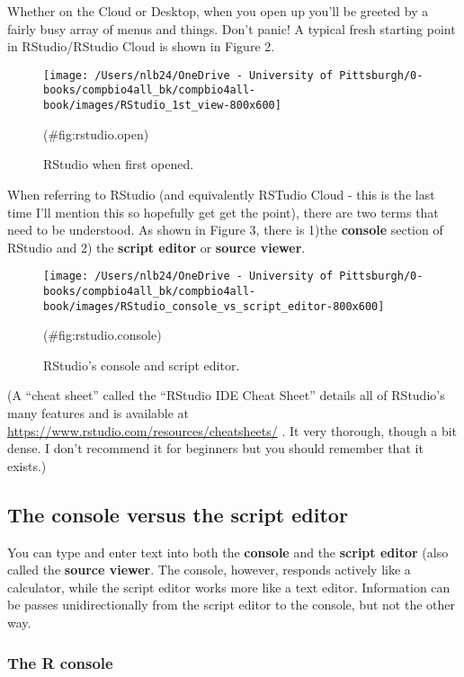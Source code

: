 \documentclass[
]{book}
\begin{document}
Whether on the Cloud or Desktop, when you open up you'll be greeted by a fairly busy array of menus and things. Don't panic! A typical fresh starting point in RStudio/RStudio Cloud is shown in Figure 2.

\begin{figure}
\texttt{[image: /Users/nlb24/OneDrive - University of Pittsburgh/0-books/compbio4all\_bk/compbio4all-book/images/RStudio\_1st\_view-800x600]} \caption{RStudio when first opened.}(\#fig:rstudio.open)
\end{figure}

When referring to RStudio (and equivalently RSTudio Cloud - this is the last time I'll mention this so hopefully get get the point), there are two terms that need to be understood. As shown in Figure 3, there is 1)the \textbf{console} section of RStudio and 2) the \textbf{script editor} or \textbf{source viewer}.

\begin{figure}
\texttt{[image: /Users/nlb24/OneDrive - University of Pittsburgh/0-books/compbio4all\_bk/compbio4all-book/images/RStudio\_console\_vs\_script\_editor-800x600]} \caption{RStudio's console and script editor.}(\#fig:rstudio.console)
\end{figure}

(A ``cheat sheet'' called the ``RStudio IDE Cheat Sheet'' details all of RStudio's many features and is available at \url{https://www.rstudio.com/resources/cheatsheets/} . It very thorough, though a bit dense. I don't recommend it for beginners but you should remember that it exists.)

\hypertarget{the-console-versus-the-script-editor}{%
\subsection{The console versus the script editor}\label{the-console-versus-the-script-editor}}

You can type and enter text into both the \textbf{console} and the \textbf{script editor} (also called the \textbf{source viewer}. The console, however, responds actively like a calculator, while the script editor works more like a text editor. Information can be passes unidirectionally from the script editor to the console, but not the other way.

\hypertarget{the-r-console}{%
\subsubsection{The R console}\label{the-r-console}}
\end{document}
